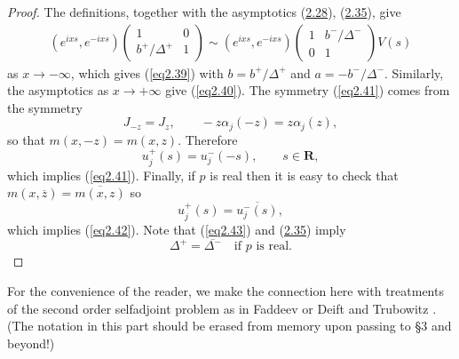 \documentclass{surv-l}
\theoremstyle{plain}
\theoremstyle{definition}
\numberwithin{equation}{chapter}
\begin{document}
\begin{proof}
The definitions, together with the asymptotics (\hyperref[eq2.28-]{2.28}), (\hyperref[eq2.35-]{2.35}), give
\begin{align*}
(e^{ixs}, e^{-ixs}) \left(\begin{array}{cc}
1 & 0\\
b^{+}/\Delta^{+} & 1
\end{array}\right)\sim(e^{ixs}, e^{-ixs}) \left(\begin{array}{cc}
1 & b^{-}/\Delta^{-}\\
0 & 1
\end{array}\right) V(s)
\end{align*}
as $ x\rightarrow-\infty$, which gives (\ref{eq2.39}) with $b=b^{+}/\Delta^{+}$ and $a=-b^{-}/\Delta^{-}$. Similarly, the asymptotics as $ x\rightarrow+\infty$ give (\ref{eq2.40}). The symmetry (\ref{eq2.41}) comes from the symmetry
\begin{equation*}
J_{-z}=J_{z},\qquad -z\alpha_{j}(-z)=z\alpha_{j}(z),
\end{equation*}
so that $m(x, -z)=m(x, z)$. Therefore
\begin{equation*}
u_{j}^{+}(s)=u_{j}^{-}(-s),\qquad s\in \mathbf{R},
\end{equation*}
which implies (\ref{eq2.41}). Finally, if $p$ is real then it is easy to check that $m(x, \overline{z})= \overline{m(x,z)}$ so
\begin{equation}\label{eq2.43}
u_{j}^{+}(s)=\overline{u_{j}^{-}(s)},
\end{equation}
which implies (\ref{eq2.42}). Note that (\ref{eq2.43}) and (\hyperref[eq2.35-]{2.35}) imply
\begin{equation}\label{eq2.44}
\Delta^{+}=\overline{{\Delta^{-}}}\quad\text{if }p\text{ is  real}.
\end{equation}
\end{proof}
For the convenience of the reader, we make the connection here with treatments of the second order selfadjoint problem as in Faddeev \cite{Fa1} or Deift and Trubowitz \cite{DT}. (The notation in this part should be erased from memory upon passing to \S 3 and beyond!)
\end{document}
